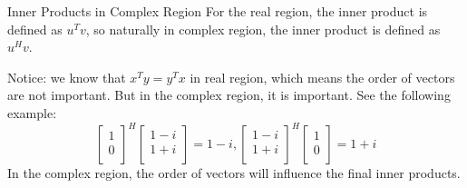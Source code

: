 \documentclass{beamer}
\begin{document}
\begin{frame}{Inner Products in Complex Region}
For the real region, the inner product is defined as $u^Tv$, so naturally in complex region, the inner product is defined as $u^Hv$.

\vspace{3pt}
Notice: we know that $x^Ty=y^Tx$ in real region, which means the order of vectors are not important. But in the complex region, it is important.
See the following example:
\begin{equation*}
    \left[ \begin{array}{c}
        1\\
        0\\
    \end{array} \right] ^H\left[ \begin{array}{c}
        1-i\\
        1+i\\
    \end{array} \right] =1-i, \left[ \begin{array}{c}
        1-i\\
        1+i\\
    \end{array} \right] ^H\left[ \begin{array}{c}
        1\\
        0\\
    \end{array} \right] =1+i
\end{equation*}
In the complex region, the order of vectors will influence the final inner products.
\end{frame}
\end{document}
